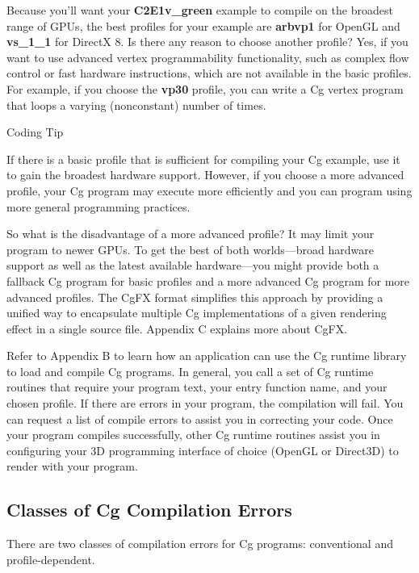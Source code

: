 \documentclass[../main.tex]{subfiles}
\begin{document}
Because you'll want your \textbf{C2E1v_green} example to compile on the broadest range of GPUs, the best profiles for your example are \textbf{arbvp1} for OpenGL and \textbf{vs_1_1} for DirectX 8. Is there any reason to choose another profile? Yes, if you want to use advanced vertex programmability functionality, such as complex flow control or fast hardware instructions, which are not available in the basic profiles. For example, if you choose the \textbf{vp30} profile, you can write a Cg vertex program that loops a varying (nonconstant) number of times.

\begin{framed}
Coding Tip

If there is a basic profile that is sufficient for compiling your Cg example, use it to gain the broadest hardware support. However, if you choose a more advanced profile, your Cg program may execute more efficiently and you can program using more general programming practices.
\end{framed}

So what is the disadvantage of a more advanced profile? It may limit your program to newer GPUs. To get the best of both worlds—broad hardware support as well as the latest available hardware—you might provide both a fallback Cg program for basic profiles and a more advanced Cg program for more advanced profiles. The CgFX format simplifies this approach by providing a unified way to encapsulate multiple Cg implementations of a given rendering effect in a single source file. Appendix C explains more about CgFX.

Refer to Appendix B to learn how an application can use the Cg runtime library to load and compile Cg programs. In general, you call a set of Cg runtime routines that require your program text, your entry function name, and your chosen profile. If there are errors in your program, the compilation will fail. You can request a list of compile errors to assist you in correcting your code. Once your program compiles successfully, other Cg runtime routines assist you in configuring your 3D programming interface of choice (OpenGL or Direct3D) to render with your program.

\subsection{Classes of Cg Compilation Errors}

There are two classes of compilation errors for Cg programs: conventional and profile-dependent.
\end{document}
